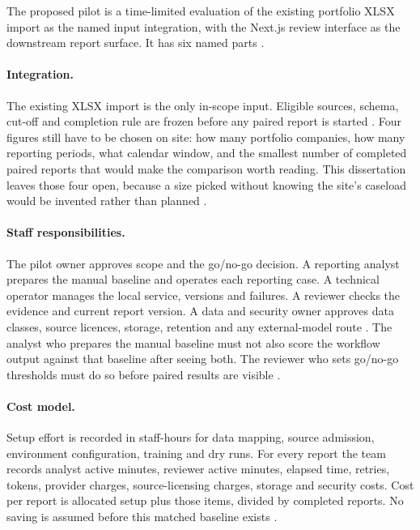 The proposed pilot is a time-limited evaluation of the existing portfolio XLSX import as the named
input integration, with the Next.js review interface as the downstream report surface. It has six
named parts \citep{pineau2021reproducibility,peffers2007dsrm}.

\paragraph{Integration.}
The existing XLSX import is the only in-scope input. Eligible sources, schema, cut-off and completion
rule are frozen before any paired report is started \citep{pineau2021reproducibility,peffers2007dsrm}.
Four figures still have to be chosen on site: how many portfolio companies, how many reporting
periods, what calendar window, and the smallest number of completed paired reports that would make
the comparison worth reading. This dissertation leaves those four open, because a size picked without
knowing the site's caseload would be invented rather than planned
\citep{gebru2021datasheets,nist2023airmf}.

\paragraph{Staff responsibilities.}
The pilot owner approves scope and the go/no-go decision. A reporting analyst prepares the manual
baseline and operates each reporting case. A technical operator manages the local service, versions
and failures. A reviewer checks the evidence and current report version. A data and security owner
approves data classes, source licences, storage, retention and any external-model route
\citep{amershi2019guidelines,nist2023airmf}. The analyst who prepares the manual baseline must not
also score the workflow output against that baseline after seeing both. The reviewer who sets
go/no-go thresholds must do so before paired results are visible
\citep{kapoor2023leakage,artstein2008agreement}.

\paragraph{Cost model.}
Setup effort is recorded in staff-hours for data mapping, source admission, environment
configuration, training and dry runs. For every report the team records analyst active minutes,
reviewer active minutes, elapsed time, retries, tokens, provider charges, source-licensing charges,
storage and security costs. Cost per report is allocated setup plus those items, divided by completed
reports. No saving is assumed before this matched baseline exists
\citep{pineau2021reproducibility,peffers2007dsrm}.

